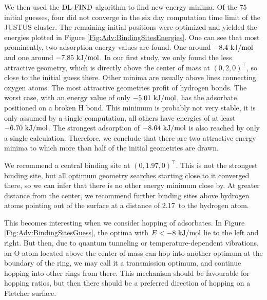 \documentclass[8.5pt,twoside,twocolumn]{article}
\newcommand\dlfind{\enmat{\te{DL-FIND}}}
\renewcommand{\Ang}{\mathring{\te{A}}}
\newcommand\kmo{\enmat{\te {kJ/mol}}}
\theoremstyle{standard}
\begin{document}
We then used the $\dlfind$ algorithm to find new energy minima. Of the 75
initial guesses, four did not converge in the six day computation time limit
of the JUSTUS cluster. The remaining initial positions were optimized
and yielded the energies plotted in Figure \ref{Fig:Adv:BindingSitesEnergies}.
One can see that most prominently, two adsorption energy values are found. One
around $-8.4~\kmo$ and one around $-7.85~\kmo$. In our first study, we only
found the less attractive geometry, which is directly above the center of mass
at $(0,2,0)^\intercal$, so close to the initial guess there. Other minima are
usually above lines connecting oxygen atoms. The most attractive geometries
profit of hydrogen bonds. The worst case, with an energy value of only
$-5.01~\kmo$, has the adsorbate positioned on a broken H bond. This minimum is
probably not very stable, it is only assumed by a single computation, all
others have energies of at least $-6.70~\kmo$. The strongest adsorption of
$-8.64~\kmo$ is also reached by only a single calculation. Therefore, we
conclude that there are two attractive energy minima to which more
than half of the initial geometries are drawn.

We recommend a central binding site at $(0,1.97,0)^\intercal$. This is not the
strongest binding site, but all optimum geometry searches starting close to it
converged there, so we can infer that there is no other energy minimum close by.
At greater distance from the center, we recommend further binding sites above
hydrogen atoms pointing out of the surface at a distance of 2.17~\Ang to the
hydrogen atom.


This becomes interesting when we consider hopping of adsorbates. In
Figure \ref{Fig:Adv:BindingSitesGuess}, the optima with $E<-8~\kmo$ lie to the
left and right. But then, due to quantum tunneling or temperature-dependent
vibrations, an O atom located above the center of mass can hop into another
optimum at the boundary of the ring, we may call it a transmission optimum, and
continue hopping into other rings from there. This mechanism should be
favourable for hopping ratios, but then there should be a preferred direction
of hopping on a Fletcher surface.
\end{document}
